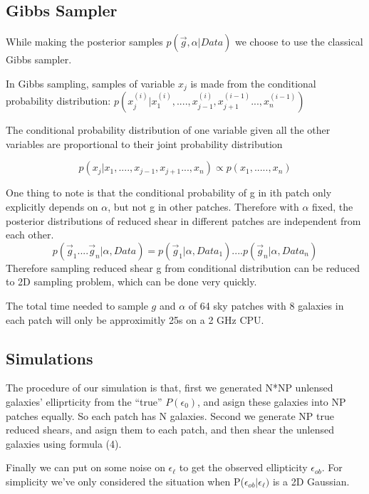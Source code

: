 \documentclass[useAMS,usenatbib]{mn2e}
\begin{document}
\subsection{Gibbs Sampler}

While making the posterior samples $p(\vec{g},\alpha|Data)$ we choose to
use the classical Gibbs sampler.

In Gibbs sampling, samples of variable $x_{j}$ is made from the conditional
probability distribution: $p(x_{j}^{(i)}|x_{1}^{(i)},....,x_{j-1}^{(i)},x_{j+1}^{(i-1)}...,x_{n}^{(i-1)})$

The conditional probability distribution of one variable given all the other variables are proportional to their joint probability distribution

\begin{equation}
p(x_{j}|x_{1},....,x_{j-1},x_{j+1}...,x_{n})\propto p(x_{1},.....,x_{n})
\end{equation}


One thing to note is that the conditional probability of g in ith
patch only explicitly depends on $\alpha$, but not g in other patches. Therefore
with $\alpha$ fixed, the posterior distributions of reduced shear in different patches are independent from each other. 
\begin{equation}
p(\vec{g}_{1}....\vec{g}_{n}|\alpha,Data)=p(\vec{g}_{1}|\alpha,Data_{1})....p(\vec{g}_{n}|\alpha,Data_{n})
\end{equation}
Therefore sampling reduced shear g from conditional distribution can be reduced to 2D sampling problem, which can be done very quickly.

The total time needed to sample $g$ and $\alpha$ of 64 sky patches with 8 galaxies in each patch will only be 
approximitly 25s on a 2 GHz CPU.


\subsection{Simulations}

The procedure of our simulation is that, first we generated N{*}NP
unlensed galaxies' elliprticity from the ``true'' $P(\epsilon_{0})$, and
asign these galaxies into NP patches equally. So each patch has N galaxies. Second
we generate NP true reduced shears, and asign them to each patch, and
then shear the unlensed galaxies using formula (4).

Finally we can put on some noise on $\epsilon_{\ell}$ to get the
observed ellipticity $\epsilon_{ob}$. For simplicity we've only considered
the situation when P($\epsilon_{ob}|\epsilon_{\ell})$ is a 2D Gaussian.
\end{document}
